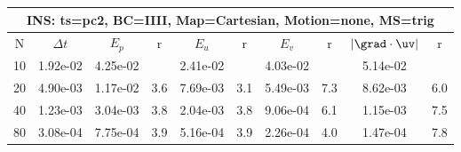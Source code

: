 
\begin{tabular}{|c|c|c|c|c|c|c|c|c|c|} \hline
 \multicolumn{10}{|c|}{INS: ts=pc2, BC=IIII, Map=Cartesian, Motion=none, MS=trig } \\ \hline 
     N  &   $\Delta t$ & $E_p$   &  r  &   $E_u$   &   r    &   $E_v$   & r   &  $|\grad\cdot\uv|$  & r   \\ \hline 
  10   &  1.92e-02  &   4.25e-02  &        &   2.41e-02  &        &   4.03e-02  &        &   5.14e-02  &        \\ 
  20   &  4.90e-03  &   1.17e-02  & 3.6  &   7.69e-03  & 3.1  &   5.49e-03  & 7.3  &   8.62e-03  & 6.0  \\ 
  40   &  1.23e-03  &   3.04e-03  & 3.8  &   2.04e-03  & 3.8  &   9.06e-04  & 6.1  &   1.15e-03  & 7.5  \\ 
  80   &  3.08e-04  &   7.75e-04  & 3.9  &   5.16e-04  & 3.9  &   2.26e-04  & 4.0  &   1.47e-04  & 7.8  \\ 
 \hline 
\end{tabular}
